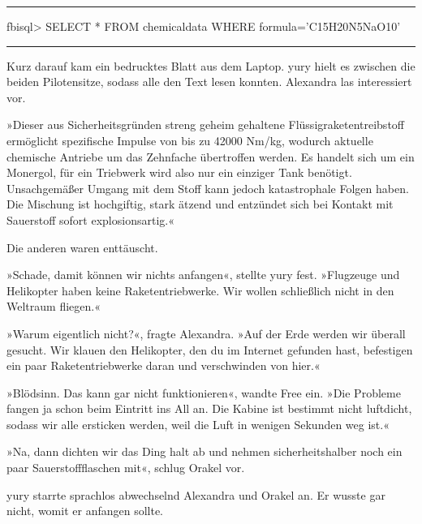 \noindent \parbox{\textwidth}{ \vspace{3ex} \hrule \vspace{3ex}

    \begin{footnotesize}
    \begin{ttfamily}

\noindent fbisql> SELECT * FROM chemicaldata WHERE formula='C15H20N5NaO10'

    \end{ttfamily}
    \end{footnotesize}

\vspace{3ex} \hrule \vspace{3ex} }

Kurz darauf kam ein bedrucktes Blatt aus dem Laptop. yury hielt es zwischen die beiden Pilotensitze, sodass alle den Text lesen konnten. Alexandra las interessiert vor.

»Dieser aus Sicherheitsgründen streng geheim gehaltene Flüssigraketentreibstoff ermöglicht spezifische Impulse von bis zu 42000 Nm/kg, wodurch aktuelle chemische Antriebe um das Zehnfache übertroffen werden. Es handelt sich um ein Monergol, für ein Triebwerk wird also nur ein einziger Tank benötigt. Unsachgemäßer Umgang mit dem Stoff kann jedoch katastrophale Folgen haben. Die Mischung ist hochgiftig, stark ätzend und entzündet sich bei Kontakt mit Sauerstoff sofort explosionsartig.«

Die anderen waren enttäuscht.

»Schade, damit können wir nichts anfangen«, stellte yury fest. »Flugzeuge und Helikopter haben keine Raketentriebwerke. Wir wollen schließlich nicht in den Weltraum fliegen.«

»Warum eigentlich nicht?«, fragte Alexandra. »Auf der Erde werden wir überall gesucht. Wir klauen den Helikopter, den du im Internet gefunden hast, befestigen ein paar Raketentriebwerke daran und verschwinden von hier.«

»Blödsinn. Das kann gar nicht funktionieren«, wandte Free ein. »Die Probleme fangen ja schon beim Eintritt ins All an. Die Kabine ist bestimmt nicht luftdicht, sodass wir alle ersticken werden, weil die Luft in wenigen Sekunden weg ist.«

»Na, dann dichten wir das Ding halt ab und nehmen sicherheitshalber noch ein paar Sauerstoffflaschen mit«, schlug Orakel vor.

yury starrte sprachlos abwechselnd Alexandra und Orakel an. Er wusste gar nicht, womit er anfangen sollte.

